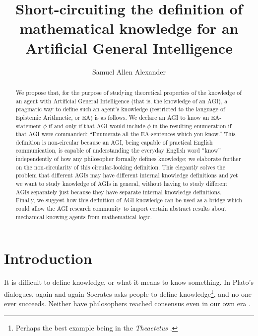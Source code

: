 \documentclass[runningheads]{llncs}
\begin{document}
\title{Short-circuiting the definition of mathematical knowledge for an
Artificial General Intelligence
}


\author{Samuel Allen
Alexander}



\maketitle

\begin{abstract}
We propose that, for the purpose of studying theoretical properties of
the knowledge of an agent with Artificial General Intelligence (that is, 
the knowledge of an AGI),
a pragmatic way to define such an agent's knowledge (restricted to the language
of Epistemic Arithmetic, or EA) is as follows.
We declare an AGI to know an EA-statement $\phi$
if and only if that AGI would include $\phi$ in the resulting
enumeration if that AGI were commanded:
``Enumerate all the EA-sentences which you know.''
This definition is non-circular because an AGI, being capable of
practical English communication, is capable of understanding the everyday
English word ``know'' independently of how any philosopher formally
defines knowledge; we elaborate further on the non-circularity of this
circular-looking definition.
This elegantly solves the problem that different AGIs may have
different internal knowledge definitions and yet we want
to study knowledge of AGIs in general, without having
to study different AGIs separately just because they have separate
internal knowledge definitions. Finally, we suggest how this
definition of AGI knowledge can be used as a bridge which could
allow the AGI research community to import certain abstract results
about mechanical knowing agents from mathematical logic.
\end{abstract}

\section{Introduction}

It is difficult to define knowledge, or what it means to know something.
In Plato's dialogues, again and again Socrates asks people to define
knowledge\footnote{Perhaps the best example being in the \emph{Theaetetus}
\cite{theaetetus}.}, and no-one ever succeeds. Neither have philosophers
reached consensus even in our own era \cite{sep-knowledge-analysis}.
\end{document}
